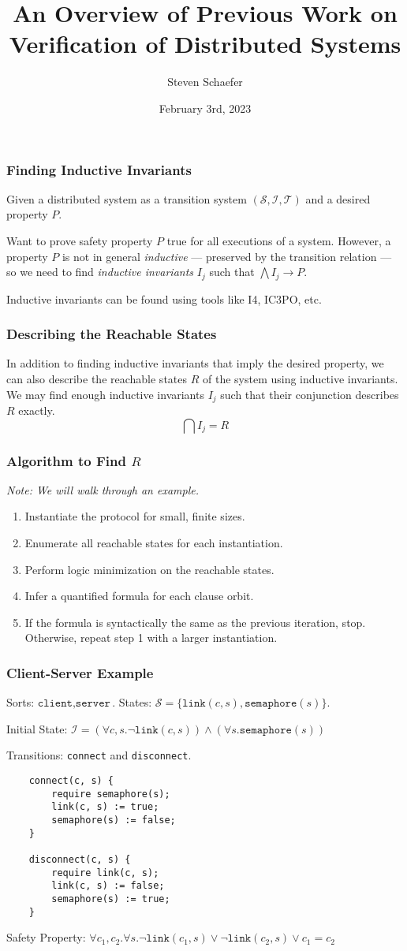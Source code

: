 \documentclass{beamer}
\title{An Overview of Previous Work on Verification of Distributed Systems}
\author{Steven Schaefer}
\institute{University of Michigan}
\date{February 3rd, 2023}
\begin{document}
\frame{\titlepage}

\begin{frame}
\frametitle{Finding Inductive Invariants}
Given a distributed system as a transition system $(\mathcal{S}, \mathcal{I}, \mathcal{T})$ and a desired property $P$. 

Want to prove safety property $P$ true for all executions of a system. However, a property $P$ is not in general \textit{inductive} --- preserved by the transition relation --- so we need to find \textit{inductive invariants} $I_j$ such that $\bigwedge I_j \rightarrow P$.

Inductive invariants can be found using tools like I4, IC3PO, etc.
\end{frame}

\begin{frame}
\frametitle{Describing the Reachable States}
In addition to finding inductive invariants that imply the desired property, we can also describe the reachable states $R$ of the system using inductive invariants. We may find enough inductive invariants $I_j$ such that their conjunction describes $R$ exactly.
\[
  \bigcap I_j = R  
\]
\end{frame}

\begin{frame}
\frametitle{Algorithm to Find $R$}
\textit{Note: We will walk through an example.}
\begin{enumerate}
    \item Instantiate the protocol for small, finite sizes.
    \item Enumerate all reachable states for each instantiation.
    \item Perform logic minimization on the reachable states.
    \item Infer a quantified formula for each clause orbit.
    \item If the formula is syntactically the same as the previous iteration, stop. Otherwise, repeat step 1 with a larger instantiation.
\end{enumerate}
\end{frame}

\begin{frame}[fragile]
\frametitle{Client-Server Example}

Sorts: $\texttt{client}, \texttt{server}$. States: $\mathcal{S} = \{ \texttt{link}(c,s), \texttt{semaphore}(s) \}$.

Initial State: $\mathcal{I} = (\forall c, s . \neg \texttt{link}(c, s)) \land (\forall s . \texttt{semaphore}(s))$

Transitions: \texttt{connect} and \texttt{disconnect}.
\begin{verbatim}
    connect(c, s) {
        require semaphore(s);
        link(c, s) := true;
        semaphore(s) := false;
    }
        
    disconnect(c, s) {
        require link(c, s);
        link(c, s) := false;
        semaphore(s) := true;
    }
\end{verbatim}
        Safety Property: $\forall c_1, c_2. \forall s . \neg \texttt{link}(c_1, s) \lor \neg \texttt{link}(c_2, s) \lor c_1 = c_2$
    \end{frame}
\end{document}
